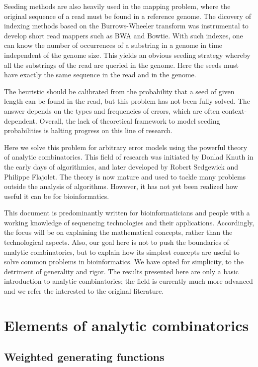\documentclass{article}
\begin{document}
Seeding methods are also heavily used in the mapping problem, where the
original sequence of a read must be found in a reference genome. The
dicovery of indexing methods based on the Burrows-Wheeler transform was
instrumental to develop short read mappers such as BWA and Bowtie. With
such indexes, one can know the number of occurrences of a substring in a
genome in time independent of the genome size. This yields an obvious
seeding strategy whereby all the substrings of the read are queried in the
genome. Here the seeds must have exactly the same sequence in the read and
in the genome.

The heuristic should be calibrated from the probability that a seed of
given length can be found in the read, but this problem has not been fully
solved. The answer depends on the types and frequencies of errors, which
are often context-dependent. Overall, the lack of theoretical framework to
model seeding probabilities is halting progress on this line of research.

Here we solve this problem for arbitrary error models using the powerful
theory of analytic combinatorics. This field of research was initiated by
Donlad Knuth in the early days of algorithmics, and later developed by
Robert Sedgewick and Philippe Flajolet. The theory is now mature and used
to tackle many problems outside the analysis of algorithms. However, it
has not yet been realized how useful it can be for bioinformatics.

This document is predominantly written for bioinformaticians and people
with a working knowledge of sequencing technologies and their applications.
Accordingly, the focus will be on explaining the mathematical concepts,
rather than the technological aspects. Also, our goal here is not to push
the boundaries of analytic combinatorics, but to explain how its simplest
concepts are useful to solve common problems in bioinformatics. We have
opted for simplicity, to the detriment of generality and rigor. The
results presented here are only a basic introduction to analytic
combinatorics; the field is currently much more advanced and we refer the
interested to the original literature.

\section{Elements of analytic combinatorics}
\label{sec:anal}

\subsection{Weighted generating functions}
\label{subsec:WGF}
\end{document}
